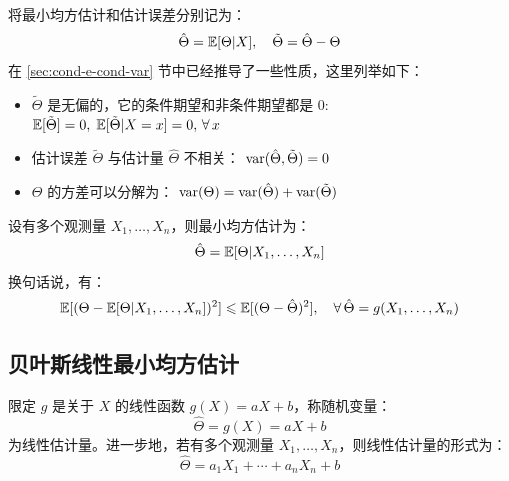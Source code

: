 \begin{property}
将最小均方估计和估计误差分别记为：
\[
\hat\Theta=\mathbb{E}[\Theta\vert X],\quad\tilde\Theta=\hat\Theta-\Theta
\]
在 \ref{sec:cond-e-cond-var} 节中已经推导了一些性质，这里列举如下：
\begin{itemize}
    \item $\tilde\Theta$ 是无偏的，它的条件期望和非条件期望都是 0:
    $\mathbb{E}[\tilde\Theta]=0,\;\mathbb{E}[\tilde\Theta\vert X=x]=0,\,\forall\,x$
    \item 估计误差 $\tilde\Theta$ 与估计量 $\hat\Theta$ 不相关：
    $\mathrm{var}(\hat\Theta,\tilde\Theta)=0$
    \item $\Theta$ 的方差可以分解为：
    $\mathrm{var}(\Theta)=\mathrm{var}(\hat\Theta)+\mathrm{var}(\tilde\Theta)$
\end{itemize}
\end{property}

\begin{theorem}[推广到多观测情形]
设有多个观测量 $X_1,\ldots,X_n$，则最小均方估计为：
\[
\hat\Theta=\mathbb{E}[\Theta\vert X_1,\ldots,X_n]
\]
换句话说，有：
\[
\mathbb{E}[(\Theta-\mathbb{E}[\Theta\vert X_1,\ldots,X_n])^2]\leqslant\mathbb{E}[(\Theta-\hat\Theta)^2],\quad\forall\,\hat\Theta=g(X_1,\ldots,X_n)
\]
\end{theorem}

\subsection{贝叶斯线性最小均方估计}
\label{sec:bayesian-lms}

\begin{definition}[线性估计量]
限定 $g$ 是关于 $X$ 的线性函数 $g(X)=aX+b$，称随机变量：
\[\hat\Theta=g(X)=aX+b\]
为线性估计量。进一步地，若有多个观测量 $X_1,\ldots,X_n$，则线性估计量的形式为：
\[\hat\Theta=a_1X_1+\cdots+a_nX_n+b\]
\end{definition}

